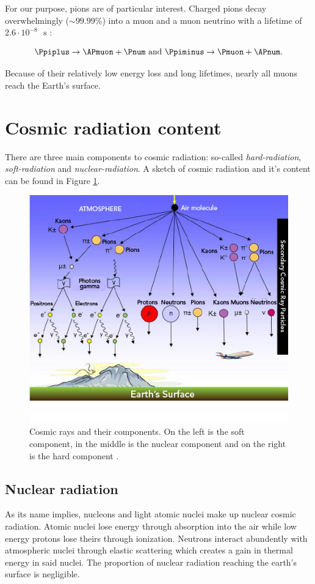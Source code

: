 For our purpose, pions are of particular interest. Charged pions decay overwhelmingly ($\sim 99.99\%$) into a muon and a muon neutrino with a lifetime of $2.6 \cdot 10^{-8} \text{ } \si{\second}$ \cite{Tanabashi:2018oca}:

\begin{equation*}
\Ppiplus \rightarrow \APmuon + \Pnum \text{ and } \Ppiminus \rightarrow \Pmuon + \APnum.
\end{equation*}

Because of their relatively low energy loss and long lifetimes, nearly all muons reach the Earth's surface.

\section{Cosmic radiation content}

There are three main components to cosmic radiation: so-called \textit{hard-radiation}, \textit{soft-radiation} and \textit{nuclear-radiation}. A sketch of cosmic radiation and it's content can be found in Figure \ref{fig:cos}.

\begin{figure}[htbp]
\centering
\includegraphics[width=0.7\linewidth]{./fig/Cosmic_ray_scattering.png}
\caption{Cosmic rays and their components. On the left is the soft component, in the middle is the nuclear component and on the right is the hard component \cite{LTSCA}.}
\label{fig:cos}
\end{figure}

\subsection{Nuclear radiation}

As its name implies, nucleons and light atomic nuclei make up nuclear cosmic radiation. Atomic nuclei lose energy through absorption into the air while low energy protons lose theirs through ionization. Neutrons interact abundently with atmospheric nuclei through elastic scattering which creates a gain in thermal energy in said nuclei. The proportion of nuclear radiation reaching the earth's surface is negligible.

